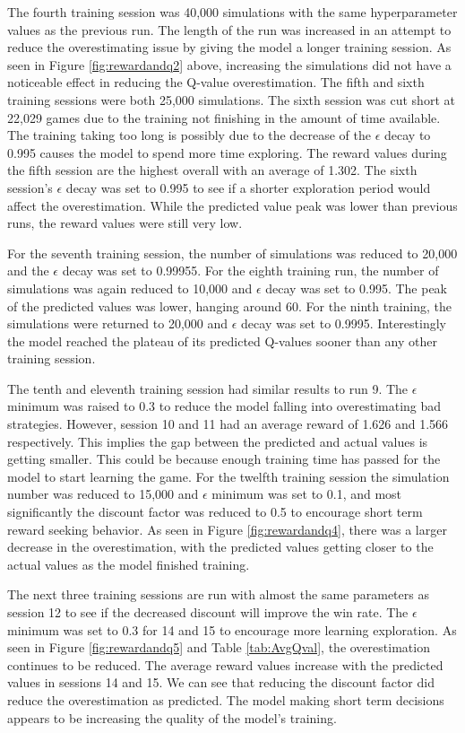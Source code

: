 \documentclass[12pt]{article}
\begin{document}
\begin{thesis}
The fourth training session was 40,000 simulations with the same hyperparameter values as the previous run. The length of the run was increased in an attempt to reduce the overestimating issue by giving the model a longer training session. As seen in Figure \ref{fig:rewardandq2} above, increasing the simulations did not have a noticeable effect in reducing the Q-value overestimation. The fifth and sixth training sessions were both 25,000 simulations. The sixth session was cut short at 22,029 games due to the training not finishing in the amount of time available. The training taking too long is possibly due to the decrease of the \(\epsilon\) decay to 0.995 causes the model to spend more time exploring. The reward values during the fifth session are the highest overall with an average of 1.302.
The sixth session's \(\epsilon\) decay was set to 0.995 to see if a shorter exploration period would affect the overestimation. While the predicted value peak was lower than previous runs, the reward values were still very low.

For the seventh training session, the number of simulations was reduced to 20,000 and the \(\epsilon\) decay was set to 0.99955. For the eighth training run, the number of simulations was again reduced to 10,000 and \(\epsilon\) decay was set to 0.995. The peak of the predicted values was lower, hanging around 60. For the ninth training, the simulations were returned to 20,000 and \(\epsilon\) decay was set to 0.9995. Interestingly the model reached the plateau of its predicted Q-values sooner than any other training session.

The tenth and eleventh training session had similar results to run 9. The \(\epsilon\) minimum was raised to 0.3 to reduce the model falling into overestimating bad strategies. However, session 10 and 11 had an average reward of 1.626 and 1.566 respectively. This implies the gap between the predicted and actual values is getting smaller. This could be because enough training time has passed for the model to start learning the game. For the twelfth training session the simulation number was reduced to 15,000 and \(\epsilon\) minimum was set to 0.1, and most significantly the discount factor was reduced to 0.5 to encourage short term reward seeking behavior. As seen in Figure \ref{fig:rewardandq4}, there was a larger decrease in the overestimation, with the predicted values getting closer to the actual values as the model finished training.

The next three training sessions are run with almost the same parameters as session 12 to see if the decreased discount will improve the win rate. The \(\epsilon\) minimum was set to 0.3 for 14 and 15 to encourage more learning exploration. As seen in Figure \ref{fig:rewardandq5} and Table \ref{tab:AvgQval}, the overestimation continues to be reduced. The average reward values increase with the predicted values in sessions 14 and 15. We can see that reducing the discount factor did reduce the overestimation as predicted. The model making short term decisions appears to be increasing the quality of the model's training.


\end{thesis}
\end{document}
